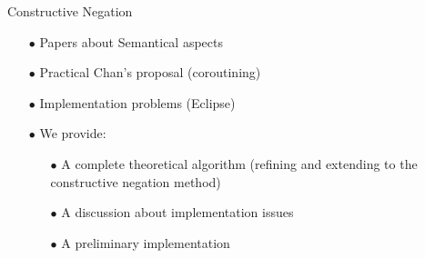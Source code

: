 \documentclass[pdf,slideColor,contemporain]{prosper}
\begin{document}
\begin{slide}{Constructive Negation}
     \begin{itemize}
        \item[{\blue $\bullet$}] Papers about {\blue Semantical} aspects
        \item[{\blue $\bullet$}] Practical {\blue Chan}'s proposal (coroutining)
        \item[{\blue $\bullet$}] Implementation {\blue problems} (Eclipse)
        \item[{\blue $\bullet$}] We provide:
              \begin{itemize}
                \item[$\bullet$] A complete theoretical {\blue algorithm} (refining and extending to the constructive negation method)
                \item[$\bullet$] A discussion about {\blue implementation} issues
                \item[$\bullet$] A preliminary implementation
              \end{itemize}
     \end{itemize}

\end{slide}
\end{document}
